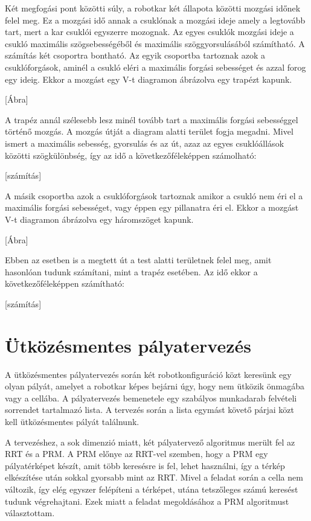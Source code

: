 Két megfogási pont közötti súly, a robotkar két állapota közötti mozgási időnek felel meg. Ez a mozgási idő annak a csuklónak a mozgási ideje amely a legtovább tart, mert a kar csuklói egyszerre mozognak. Az egyes csuklók mozgási ideje a csukló maximális szögsebességéből és maximális szöggyorsulásából számítható. A számítás két csoportra bontható. Az egyik csoportba tartoznak azok a csuklóforgások, aminél a csukló eléri a maximális forgási sebességet és azzal forog egy ideig. Ekkor a mozgást egy V-t diagramon ábrázolva egy trapézt kapunk. 

[Ábra]

A trapéz annál szélesebb lesz minél tovább tart a maximális forgási sebességgel történő mozgás. A mozgás útját a diagram alatti terület fogja megadni. Mivel ismert a maximális sebesség, gyorsulás és az út, azaz az egyes csuklóállások közötti szögkülönbség, így az idő a következőféleképpen számolható: 

[számítás]

A másik csoportba azok a csuklóforgások tartoznak amikor a csukló nem éri el a maximális forgási sebességet, vagy éppen egy pillanatra éri el. Ekkor a mozgást V-t diagramon ábrázolva egy háromszöget kapunk. 

[Ábra]

Ebben az esetben is a megtett út a test alatti területnek felel meg, amit hasonlóan tudunk számítani, mint a trapéz esetében. Az idő ekkor a következőféleképpen  számítható:

[számítás]

\section{Ütközésmentes pályatervezés}


A ütközésmentes pályatervezés során két robotkonfiguráció közt keresünk egy olyan pályát, amelyet a robotkar képes bejárni úgy, hogy nem ütközik önmagába vagy a cellába. A pályatervezés bemenetele egy szabályos munkadarab felvételi sorrendet tartalmazó lista. A tervezés során a lista egymást követő párjai közt kell ütközésmentes pályát találnunk.

A tervezéshez, a sok dimenzió miatt, két pályatervező algoritmus merült fel az RRT és a PRM. A PRM előnye az RRT-vel szemben, hogy a PRM egy pályatérképet készít, amit több keresésre is fel, lehet használni, így a térkép elkészítése után sokkal gyorsabb mint az RRT. Mivel a feladat során a cella nem változik, így elég egyszer felépíteni a térképet, utána tetszőleges számú keresést tudunk végrehajtani. Ezek miatt a feladat megoldásához a PRM algoritmust választottam.

